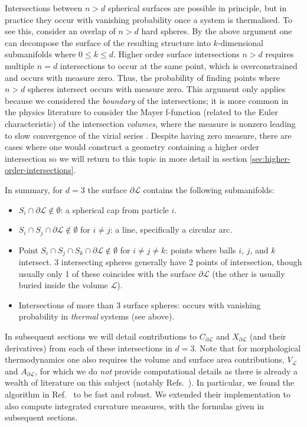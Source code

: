 Intersections between $n > d$ spherical surfaces are possible in principle, but in practice they occur with vanishing probability once a system is thermalised.
To see this, consider an overlap of $n > d$ hard spheres.
By the above argument one can decompose the surface of the resulting structure into $k$-dimensional submanifolds where $0 \le k \le d$.
Higher order surface intersections $n>d$ requires multiple $n=d$ intersections to occur at the same point, which is overconstrained and occurs with measure zero.
Thus, the probability of finding points where $n > d$ spheres intersect occurs with measure zero.
This argument only applies because we considered the \emph{boundary} of the intersections; it is more common in the physics literature to consider the Mayer f-function (related to the Euler characteristic) of the intersection \emph{volumes}, where the measure is nonzero leading to slow convergence of the virial series \cite{Hansen2013}.
Despite having zero measure, there are cases where one would construct a geometry containing a higher order intersection so we will return to this topic in more detail in section \ref{sec:higher-order-intersections}.

In summary, for $d=3$ the surface $\partial\mathcal{L}$ contains the following submanifolds:
\begin{itemize}
\item $S_i \cap \partial\mathcal{L} \notin \emptyset$: a spherical cap from particle $i$.
\item $S_i \cap S_j \cap \partial\mathcal{L} \notin \emptyset$ for $i \ne j$: a line, specifically a circular arc.
\item Point $S_i \cap S_j \cap S_k \cap \partial\mathcal{L} \notin \emptyset$ for $i \ne j \ne k$: points where balls $i$, $j$, and $k$ intersect.
  3 intersecting spheres generally have 2 points of intersection, though usually only 1 of these coincides with the surface $\partial\mathcal{L}$ (the other is usually buried inside the volume $\mathcal{L}$).
\item Intersections of more than 3 surface spheres: occurs with vanishing probability in \emph{thermal} systems (see above).
\end{itemize}

In subsequent sections we will detail contributions to $C_{\partial\mathcal{L}}$ and $X_{\partial\mathcal{L}}$ (and their derivatives) from each of these intersections in $d=3$.
Note that for morphological thermodynamics one also requires the volume and surface area contributions, $V_\mathcal{L}$ and $A_{\partial\mathcal{L}}$, for which we do \emph{not} provide computational details as there is already a wealth of literature on this subject (notably Refs.\ \cite{Edelsbrunner2003,Bryant2004}).
In particular, we found the algorithm in Ref.\ \cite{Klenin2011} to be fast and robust.
We extended their implementation to also compute integrated curvature measures, with the formulas given in subsequent sections.

